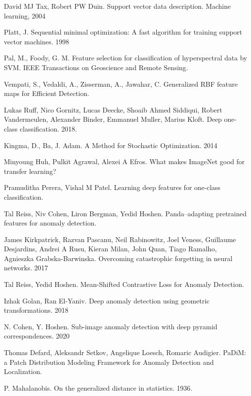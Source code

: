 \documentclass{article}
\begin{document}
\begin{large}
\begin{thebibliography}{3}
	David MJ Tax, Robert PW Duin.
	Support vector data description. Machine learning, 2004
	
	Platt, J.
	Sequential minimal optimization: A fast algorithm for training support vector machines. 1998
	
	Pal, M., Foody, G. M.
	Feature selection for classification of hyperspectral data by SVM. IEEE Transactions on Geoscience and Remote Sensing.
	
	Vempati, S., Vedaldi, A., Zisserman, A., Jawahar, C.
	Generalized RBF feature maps for Efficient Detection.
	
	Lukas Ruff, Nico Gornitz, Lucas Deecke, Shoaib Ahmed Siddiqui, Robert Vandermeulen, Alexander Binder, Emmanuel Muller, Marius Kloft.
	Deep one-class classification. 2018.
	
	Kingma, D., Ba, J. Adam.
	A Method for Stochastic Optimization. 2014
	
	Minyoung Huh, Pulkit Agrawal, Alexei A Efros.
	What makes ImageNet good for transfer learning?
	
	Pramuditha Perera, Vishal M Patel.
	Learning deep features for one-class classification.
	
	Tal Reiss, Niv Cohen, Liron Bergman, Yedid Hoshen.
	Panda–adapting pretrained features for anomaly detection.
	
	James Kirkpatrick, Razvan Pascanu, Neil Rabinowitz, Joel Veness, Guillaume Desjardins, Andrei A Rusu, Kieran Milan, John Quan, Tiago Ramalho, Agnieszka Grabska-Barwinska.
	Overcoming catastrophic forgetting in neural networks. 2017
	
	Tal Reiss, Yedid Hoshen.
	Mean-Shifted Contrastive Loss for Anomaly Detection.
	
	Izhak Golan, Ran El-Yaniv.
	Deep anomaly detection using geometric transformations. 2018
	
	N. Cohen, Y. Hoshen.
	Sub-image anomaly detection with deep pyramid correspondences. 2020
	
	Thomas Defard, Aleksandr Setkov, Angelique Loesch, Romaric Audigier.
	PaDiM: a Patch Distribution Modeling Framework for Anomaly Detection and Localization.
	
	P. Mahalanobis.
	On the generalized distance in statistics. 1936.
	

\end{thebibliography}
\end{large}
\end{document}
